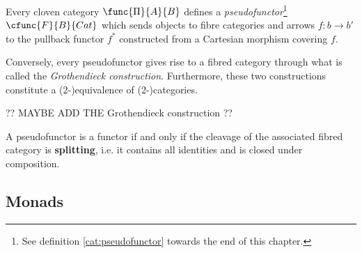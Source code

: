     \begin{property}
        Every cloven category $\func{\Pi}{A}{B}$ defines a \textit{pseudofunctor}\footnote{See definition \ref{cat:pseudofunctor} towards the end of this chapter.} $\cfunc{F}{B}{Cat}$ which sends objects to fibre categories and arrows $f:b\rightarrow b'$ to the pullback functor $f^*$ constructed from a Cartesian morphism covering $f$.

        Conversely, every pseudofunctor gives rise to a fibred category through what is called the \textit{Grothendieck construction}. Furthermore, these two constructions constitute a (2-)equivalence of (2-)categories.

        ?? MAYBE ADD THE Grothendieck construction ??
    \end{property}
    \begin{property}[Functors]
        A pseudofunctor is a functor if and only if the cleavage of the associated fibred category is \textbf{splitting}, i.e. it contains all identities and is closed under composition.
    \end{property}

\subsection{Monads}


